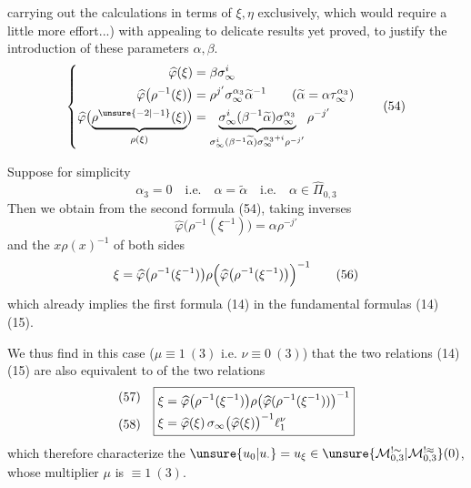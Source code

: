 
carrying out the calculations in terms of $\xi,\eta$ exclusively, which would require a little more effort...) with appealing to delicate results  yet proved,  to justify the introduction of these parameters $\alpha,\beta$.
\[
\left\{
\begin{aligned}
\widehat{\varphi}(\xi)&=\beta\sigma_\infty^i\\
\widehat{\varphi}\bigl(\rho^{-1}(\xi)\bigr)&=\rho^{j'}\sigma_\infty^{\alpha_3}\widetilde\alpha^{-1}
\qquad(\widetilde\alpha=\alpha\tau_\infty^{\alpha_3})\\
\widehat{\varphi}\bigl(\underbrace{\rho^{\unsure{-2|-1}}(\xi)}_{\rho(\xi)}\bigr)
&=\underbrace{\sigma_\infty^i(\beta^{-1}\widetilde\alpha)\sigma_\infty^{\alpha_3}}_{\sigma_\infty^i(\beta^{-1}\widetilde\alpha)\sigma_\infty^{\alpha_3+i}\rho^{-j'}}\rho^{-j'}
\end{aligned}
\right.
\tag{54}
\]

Suppose for simplicity
\[
\alpha_3=0\quad\text{i.e.}\quad\alpha=\widetilde\alpha\quad\text{i.e.}\quad\alpha\in\widehat\Pi_{0,3}
\tag{55}
\]
Then we obtain from the second formula (54), taking inverses
\[
\widehat{\varphi}\bigl(\rho^{-1}(\xi^{-1})\bigr)=\alpha\rho^{-j'}
\]
and the $x\rho(x)^{-1}$ of both sides
\[
\xi=\widehat{\varphi}\bigl(\rho^{-1}(\xi^{-1})\bigr)\rho\Bigl(\widehat{\varphi}\bigl(\rho^{-1}(\xi^{-1})\bigr)\Bigr)^{-1}
\tag{56}
\]
which already implies the first formula (14) in the fundamental formulas (14) (15).


We thus find in this case ($\mu\equiv1\ (3)$ i.e.
$\nu\equiv0\ (3)$) that the two relations (14) (15)
are also equivalent to  of the two relations
\[
\begin{array}{c@{\quad}c}
\begin{gathered}(57)\\[1.5ex](58)\end{gathered}&
\boxed{\begin{aligned}
\xi&=
\widehat\varphi\bigl(\rho^{-1}(\xi^{-1})\bigr)
\rho\bigl(\widehat\varphi(\rho^{-1}(\xi^{-1}))\bigr)^{-1}
\\
\xi&=\widehat\varphi(\xi)\,
\sigma_\infty\bigl(\widehat\varphi(\xi)\bigr)^{-1}
\ell_1^\nu
\end{aligned}}
\end{array}
\]
which therefore characterize the
$\unsure{u_0|u_{\cdot}}=u_{\xi}\in
\unsure{\mathcal M_{0,3}^{!\sim}|\mathcal M_{0,3}^{!\approx}}(0)$,
whose multiplier $\mu$ is $\equiv1\ (3)$.

